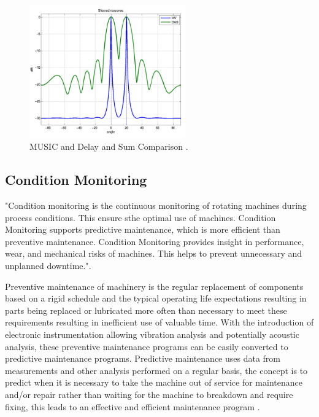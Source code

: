 \documentclass{UoNMCHA}
\numberwithin{equation}{section}
\begin{document}
    \begin{figure}[H]
        \centering
        \includegraphics[keepaspectratio, width = 0.6\textwidth]{Figures/DASMUSICcomparison.png}
        \caption{MUSIC and Delay and Sum Comparison \citep{Nas12}.}
        \label{fig:das music comparison}
    \end{figure}
    
    \subsection{Condition Monitoring} \label{sec:Condition Monitoring}
    "Condition monitoring is the continuous monitoring of rotating machines during process conditions. This ensure sthe optimal use of machines. Condition Monitoring supports predictive maintenance, which is more efficient than preventive maintenance. Condition Monitoring provides insight in performance, wear, and mechanical risks of machines. This helps to prevent unnecessary and unplanned downtime."\citep{Ist}.
    
    Preventive maintenance of machinery is the regular replacement of components based on a rigid schedule and the typical operating life expectations resulting in parts being replaced or lubricated more often than necessary to meet these requirements resulting in inefficient use of valuable time. With the introduction of electronic instrumentation allowing vibration analysis and potentially acoustic analysis, these preventive maintenance programs can be easily converted to predictive maintenance programs. Predictive maintenance uses data from measurements and other analysis performed on a regular basis, the concept is to predict when it is necessary to take the machine out of service for maintenance and/or repair rather than waiting for the machine to breakdown and require fixing, this leads to an effective and efficient maintenance program \citep{Laws87}.
    
\end{document}
